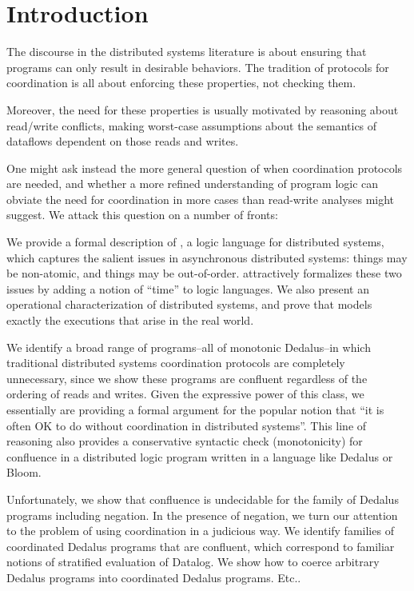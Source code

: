 \section{Introduction}

The discourse in the distributed systems literature is about ensuring that programs can only result in desirable behaviors.  The tradition of protocols for coordination is all about enforcing these properties, not checking them.

Moreover, the need for these properties is usually motivated by reasoning about
read/write conflicts, making worst-case assumptions about the semantics of dataflows
dependent on those reads and writes.  

One might ask instead the more general question of when coordination protocols are
needed, and whether a more refined understanding of program logic can obviate the need
for coordination in more cases than read-write analyses might suggest.  We attack this
question on a number of fronts:

We provide a formal description of \lang, a logic language for distributed systems, which captures the salient issues in asynchronous distributed systems: things  may be non-atomic, and things may be out-of-order.  \lang attractively formalizes these two issues by adding a notion of ``time'' to logic languages.  We also present an operational characterization of distributed systems, and prove that \lang models exactly  the executions that arise in the real world.

We identify a broad range of programs--all of monotonic Dedalus--in which traditional
distributed systems coordination protocols are completely unnecessary, since we show
these programs are confluent regardless of the ordering of reads and writes. Given the
expressive power of this class, we essentially are providing a formal argument for the
popular notion that ``it is often OK to do without coordination in distributed systems''. This line of reasoning also provides a conservative syntactic  check (monotonicity) for confluence in a distributed logic program written in a language like Dedalus or Bloom.

Unfortunately, we show that confluence is undecidable for the family of Dedalus
programs including negation.  In the presence of negation, we turn our attention to the
problem of using coordination in a judicious way.  We identify families of coordinated
Dedalus programs that are confluent, which correspond to familiar notions of stratified
evaluation of Datalog.  We show how to coerce arbitrary Dedalus programs into
coordinated Dedalus programs.  Etc..

